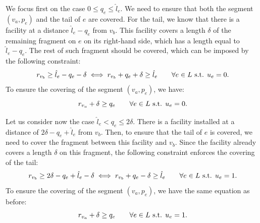 We focus first on the case $0 \le q_{e} \le  \hat l_{e}$. We need to ensure that both the segment $(v_a,p_e)$ and the tail of $e$ are covered.
For the tail, we know that there is a facility at a distance $\hat l_e-q_{e}$ from $v_b$. This facility covers a length $\delta$ of the remaining fragment on $e$ on its right-hand side, which has a length equal to $ \hat l_{e}-q_{e}$.  The rest of such fragment should be covered, which can be imposed by the following constraint:
  \begin{equation}
  \label{eq.cvu0}
  	r_{v_{b}} \ge \hat l_e-q_{e}-\delta \iff	r_{v_{b}}+q_{e} + \delta \ge \hat l_e \qquad \forall e \in L \textup{ s.t. } u_{e} =0.
  \end{equation}
To ensure the covering of the segment $(v_a,p_e)$, we have:
	\begin{equation}
 	r_{v_{a}}+\delta \ge q_{e} \qquad  \forall e \in L \textup{ s.t. } u_{e} =0. \nonumber
  \end{equation}
 
 
Let us consider now the case $\hat l_{e} < q_{e} \le 2\delta$.  There is a facility installed at a distance of $2\delta - q_{e} + \hat l_e$ from $v_b$. Then, to ensure that the tail of $e$ is covered, we need to cover the fragment between this facility and $v_b$. Since the facility already covers a length $\delta$ on this fragment, the following constraint enforces the covering of the tail:
  \begin{equation}
  \label{eq.cvu1}
  	r_{v_{b}}\ge 2\delta  - q_{e}+ \hat l_{e}  -\delta   \iff  r_{v_{b}}+q_{e} - \delta \ge\hat l_{e}   \qquad\forall e \in L \textup{ s.t. } u_{e} =1.
  \end{equation}
To ensure the covering of the segment $(v_a,p_e)$, we have the same equation as before:
	\begin{equation}
 	r_{v_{a}}+\delta \ge q_{e} \qquad  \forall e \in L \textup{ s.t. } u_{e} =1. \nonumber
  \end{equation}

